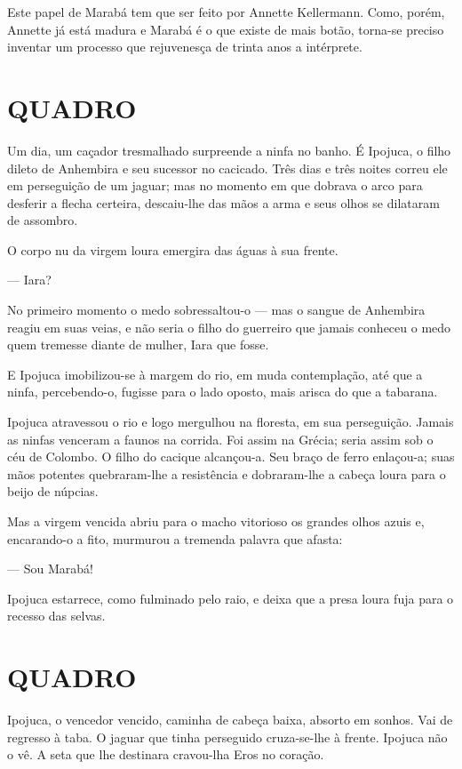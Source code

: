 Este papel de Marabá tem que ser feito por Annette Kellermann. Como,
porém, Annette já está madura e Marabá é o que existe de mais botão,
torna-se preciso inventar um processo que rejuvenesça de trinta anos a
intérprete.

\section{QUADRO}

Um dia, um caçador tresmalhado surpreende a ninfa no banho. É Ipojuca, o
filho dileto de Anhembira e seu sucessor no cacicado. Três dias e três
noites correu ele em perseguição de um jaguar; mas no momento em que
dobrava o arco para desferir a flecha certeira, descaiu-lhe das mãos a
arma e seus olhos se dilataram de assombro.

O corpo nu da virgem loura emergira das águas à sua frente.

--- Iara?

No primeiro momento o medo sobressaltou-o --- mas o sangue de Anhembira
reagiu em suas veias, e não seria o filho do guerreiro que jamais
conheceu o medo quem tremesse diante de mulher, Iara que fosse.

E Ipojuca imobilizou-se à margem do rio, em muda contemplação, até que a
ninfa, percebendo-o, fugisse para o lado oposto, mais arisca do que a
tabarana.

Ipojuca atravessou o rio e logo mergulhou na floresta, em sua
perseguição. Jamais as ninfas venceram a faunos na corrida. Foi assim na
Grécia; seria assim sob o céu de Colombo. O filho do cacique alcançou-a.
Seu braço de ferro enlaçou-a; suas mãos potentes quebraram-lhe a
resistência e dobraram-lhe a cabeça loura para o beijo de núpcias.

Mas a virgem vencida abriu para o macho vitorioso os grandes olhos azuis
e, encarando-o a fito, murmurou a tremenda palavra que afasta:

--- Sou Marabá!

Ipojuca estarrece, como fulminado pelo raio, e deixa que a presa loura
fuja para o recesso das selvas.

\section{QUADRO}

Ipojuca, o vencedor vencido, caminha de cabeça baixa, absorto em sonhos.
Vai de regresso à taba. O jaguar que tinha perseguido cruza-se-lhe à
frente. Ipojuca não o vê. A seta que lhe destinara cravou-lha Eros no
coração.

